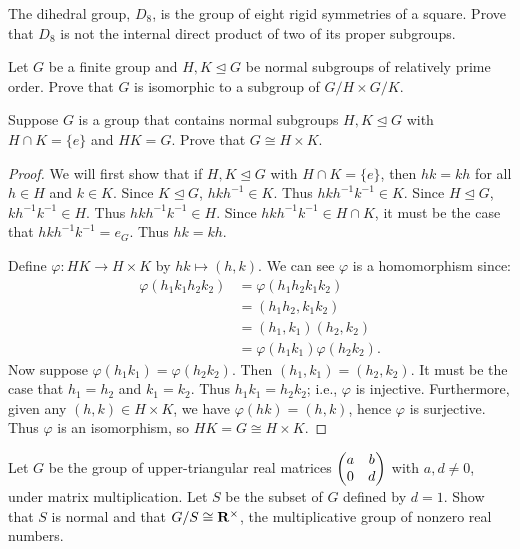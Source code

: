 \documentclass[11pt,twoside,openany]{memoir}
\begin{document}
    \begin{exercise}
        The dihedral group, $D_8$, is the group of eight rigid symmetries of a square. Prove that $D_8$ is not the internal direct product of two of its proper subgroups.
    \end{exercise}

    \begin{exercise}
        Let $G$ be a finite group and $H,K\mathrel{\unlhd}G$ be normal subgroups of relatively prime order. Prove that $G$ is isomorphic to a subgroup of $G/H\times G/K$.
    \end{exercise}

    \begin{exercise}
        Suppose $G$ is a group that contains normal subgroups $H,K\unlhd G$ with $H\cap K=\{e\}$ and $HK=G$. Prove that $G\cong H\times K$.
    \end{exercise}
        \begingroup\color{blue}
        \begin{proof}
            We will first show that if $H,K \unlhd G$ with $H\cap K=\{e\}$, then $hk = kh$ for all $h \in H$ and $k \in K$. Since $K \unlhd G$, $hkh^{-1} \in K$. Thus $hkh^{-1}k^{-1} \in K$. Since $H \unlhd G$, $kh^{-1}k^{-1} \in H$. Thus $hkh^{-1}k^{-1} \in H$. Since $hkh^{-1}k^{-1} \in H \cap K$, it must be the case that $hkh^{-1}k^{-1} = e_G$. Thus $hk = kh$.

            Define $\varphi:HK \rightarrow H \times K$ by $hk \mapsto (h,k)$. We can see $\varphi$ is a homomorphism since:
                \begin{equation*}
                \begin{split}
                    \varphi(h_1k_1 h_2 k_2)
                    & = \varphi(h_1 h_2 k_1 k_2) \\
                    & = (h_1 h_2 , k_1 k_2) \\
                    & = (h_1,k_1)(h_2,k_2) \\
                    & = \varphi(h_1k_1)\varphi(h_2 k_2).
                \end{split}
                \end{equation*}
            Now suppose $\varphi(h_1 k_1) = \varphi(h_2 k_2)$. Then $(h_1,k_1) = (h_2,k_2)$. It must be the case that $h_1 = h_2$ and $k_1 = k_2$. Thus $h_1k_1 = h_2k_2$; i.e., $\varphi$ is injective. Furthermore, given any $(h,k) \in H \times K$, we have $\varphi(hk) = (h,k)$, hence $\varphi$ is surjective. Thus $\varphi$ is an isomorphism, so $HK = G \cong H \times K$. \qedhere


        \end{proof}\endgroup
    \begin{exercise}
        Let $G$ be the group of upper-triangular real matrices $\left( \begin{matrix} a & b \\ 0 & d\end{matrix} \right)$ with $a,d\neq 0$, under matrix multiplication. Let $S$ be the subset of $G$ defined by $d=1$. Show that $S$ is normal and that $G/S\cong {\mathbf{R}}^{\times}$, the multiplicative group of nonzero real numbers.
    \end{exercise}
\end{document}
